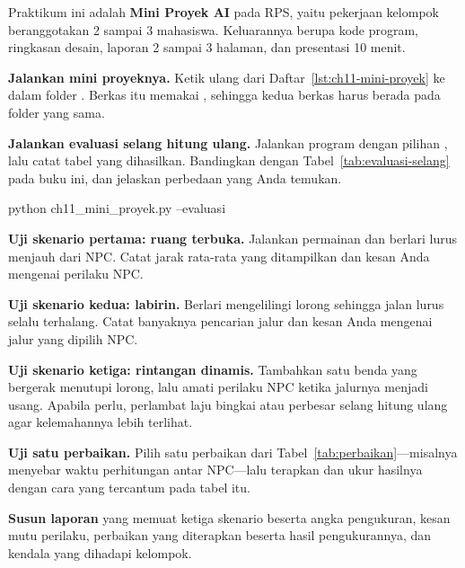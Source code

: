 \begin{praktikumbox}
Praktikum ini adalah \textbf{Mini Proyek AI} pada RPS, yaitu pekerjaan
kelompok beranggotakan 2 sampai 3 mahasiswa. Keluarannya berupa kode program,
ringkasan desain, laporan  2 sampai 3 halaman, dan presentasi
10 menit.

\begin{langkah}
  \item \textbf{Jalankan mini proyeknya.} Ketik ulang 
        dari Daftar~\ref{lst:ch11-mini-proyek} ke dalam folder .
        Berkas itu memakai , sehingga kedua
        berkas harus berada pada folder yang sama.

  \item \textbf{Jalankan evaluasi selang hitung ulang.} Jalankan program
        dengan pilihan , lalu catat tabel yang dihasilkan.
        Bandingkan dengan Tabel~\ref{tab:evaluasi-selang} pada buku ini, dan
        jelaskan perbedaan yang Anda temukan.
\begin{kodekeluaran}
python ch11_mini_proyek.py --evaluasi
\end{kodekeluaran}

  \item \textbf{Uji skenario pertama: ruang terbuka.} Jalankan permainan dan
        berlari lurus menjauh dari NPC. Catat jarak rata-rata yang ditampilkan
        dan kesan Anda mengenai perilaku NPC.

  \item \textbf{Uji skenario kedua: labirin.} Berlari mengelilingi lorong
        sehingga jalan lurus selalu terhalang. Catat banyaknya pencarian jalur
        dan kesan Anda mengenai jalur yang dipilih NPC.

  \item \textbf{Uji skenario ketiga: rintangan dinamis.} Tambahkan satu benda
        yang bergerak menutupi lorong, lalu amati perilaku NPC ketika jalurnya
        menjadi usang. Apabila perlu, perlambat laju bingkai atau perbesar
        selang hitung ulang agar kelemahannya lebih terlihat.

  \item \textbf{Uji satu perbaikan.} Pilih satu perbaikan dari
        Tabel~\ref{tab:perbaikan}---misalnya menyebar waktu perhitungan antar
        NPC---lalu terapkan dan ukur hasilnya dengan cara yang tercantum pada
        tabel itu.

  \item \textbf{Susun laporan } yang memuat ketiga skenario
        beserta angka pengukuran, kesan mutu perilaku, perbaikan yang
        diterapkan beserta hasil pengukurannya, dan kendala yang dihadapi
        kelompok.


\end{langkah}
\end{praktikumbox}
